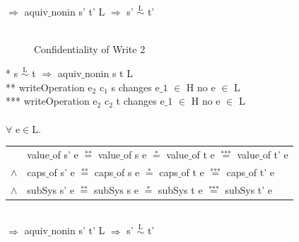 \documentclass[pdftex,11pt,a4paper,twoside]{article}
\begin{document}
$\Rightarrow$ aquiv$\_$nonin s' t' L $\Rightarrow$ s' $\overset{\text{L}}{\sim}$ t' \\ \\
\begin{figure}[H]
\caption{Confidentiality of Write 2}
\end{figure}
* s $\overset{\text{L}}{\sim}$ t $\Rightarrow$ aquiv$\_$nonin s t L	\\ 
** writeOperation e$_2$ c$_1$ s changes e$\_1$ $\in$ H no e $\in$ L \\ 
*** writeOperation e$_2$ c$_2$ t changes e$\_1$ $\in$ H no e $\in$ L \\ \\
$\forall$ e$\in$L. \\
\begin{tabular}{ll}
& value$\_$of s' e $\overset{\text{**}}{=}$ value$\_$of s e $\overset{\text{*}}{=}$ value$\_$of t e $\overset{\text{***}}{=}$ value$\_$of t' e \\
$\wedge$ & caps$\_$of s' e $\overset{\text{**}}{=}$ caps$\_$of s e $\overset{\text{*}}{=}$ caps$\_$of t e $\overset{\text{***}}{=}$ caps$\_$of t' e \\
$\wedge$ & subSys s' e $\overset{\text{**}}{=}$ subSys s e $\overset{\text{*}}{=}$ subSys t e $\overset{\text{***}}{=}$ subSys t' e
\end{tabular} \\
$\Rightarrow$ aquiv$\_$nonin s' t' L $\Rightarrow$ s' $\overset{\text{L}}{\sim}$ t'
\end{document}
